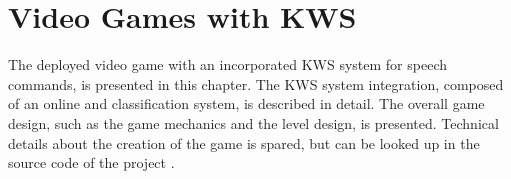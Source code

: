 
\chapter{Video Games with KWS}\label{sec:game}
The deployed video game with an incorporated KWS system for speech commands, is presented in this chapter.
The KWS system integration, composed of an online and classification system, is described in detail.
The overall game design, such as the game mechanics and the level design, is presented.
Technical details about the creation of the game is spared, but can be looked up in the source code of the project \cite{KWSGame}.



